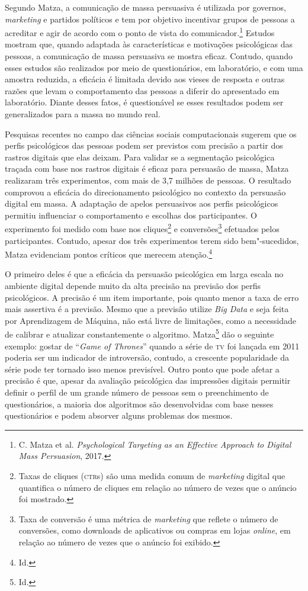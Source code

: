 Segundo Matza, a comunicação de massa persuasiva é
utilizada por governos, \emph{marketing} e partidos políticos e tem por
objetivo incentivar grupos de pessoas a acreditar e agir de acordo com o
ponto de vista do comunicador.\footnote{C. Matza et al. \emph{Psychological Targeting as an Effective Approach to Digital Mass
Persuasion}, 2017.} Estudos mostram que, quando adaptada às
características e motivações psicológicas das pessoas, a comunicação de
massa persuasiva se mostra eficaz. Contudo, quando esses estudos são
realizados por meio de questionários, em laboratório, e com uma amostra
reduzida, a eficácia é limitada devido aos vieses de resposta e outras
razões que levam o comportamento das pessoas a diferir do apresentado em
laboratório. Diante desses fatos, é questionável se esses resultados
podem ser generalizados para a massa no mundo real.

Pesquisas recentes no campo das ciências sociais computacionais sugerem
que os perfis psicológicos das pessoas podem ser previstos com precisão
a partir dos rastros digitais que elas deixam. Para validar se a
segmentação psicológica traçada com base nos rastros digitais é eficaz
para persuasão de massa, Matza realizaram três
experimentos, com mais de 3,7 milhões de pessoas. O resultado comprovou
a eficácia do direcionamento psicológico no contexto da persuasão
digital em massa. A adaptação de apelos persuasivos aos perfis
psicológicos permitiu influenciar o comportamento e escolhas dos
participantes. O experimento foi medido com base nos cliques\footnote{Taxas
  de cliques (\textsc{ctr}s) são uma medida comum de \emph{marketing} digital que
  quantifica o número de cliques em relação ao número de vezes que o
  anúncio foi mostrado.} e conversões\footnote{Taxa de conversão é uma
  métrica de \emph{marketing} que reflete o número de conversões, como
  downloads de aplicativos ou compras em lojas \emph{online}, em relação ao
  número de vezes que o anúncio foi exibido.} efetuados pelos
participantes. Contudo, apesar dos três experimentos terem sido
bem"-sucedidos, Matza evidenciam pontos críticos que merecem
atenção.\footnote{Id.}

O primeiro deles é que a eficácia da persuasão psicológica em larga
escala no ambiente digital depende muito da alta precisão na previsão
dos perfis psicológicos. A precisão é um item importante, pois quanto
menor a taxa de erro mais assertiva é a previsão. Mesmo que a previsão
utilize \emph{Big Data} e seja feita por Aprendizagem de Máquina, não
está livre de limitações, como a necessidade de calibrar e atualizar
constantemente o algoritmo. Matza\footnote{Id.} dão o seguinte exemplo:
gostar de ``\emph{Game of Thrones}'' quando a série de \textsc{tv} foi lançada em
2011 poderia ser um indicador de introversão, contudo, a crescente
popularidade da série pode ter tornado isso menos previsível. Outro
ponto que pode afetar a precisão é que, apesar da avaliação psicológica
das impressões digitais permitir definir o perfil de um grande número de
pessoas sem o preenchimento de questionários, a maioria dos algoritmos
são desenvolvidas com base nesses questionários e podem absorver alguns
problemas dos mesmos.

